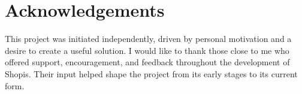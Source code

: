 \chapter*{\center \Large  Acknowledgements}
This project was initiated independently, driven by personal motivation and a desire to create a useful solution. I would like to thank those close to me who offered support, encouragement, and feedback throughout the development of Shopis. Their input helped shape the project from its early stages to its current form.  

